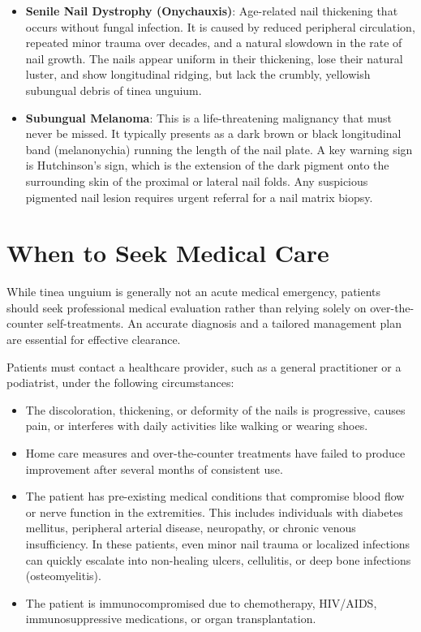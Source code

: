 \begin{itemize}
    \item \textbf{Senile Nail Dystrophy (Onychauxis)}: Age-related nail thickening that occurs without fungal infection. It is caused by reduced peripheral circulation, repeated minor trauma over decades, and a natural slowdown in the rate of nail growth. The nails appear uniform in their thickening, lose their natural luster, and show longitudinal ridging, but lack the crumbly, yellowish subungual debris of tinea unguium.
    \item \textbf{Subungual Melanoma}: This is a life-threatening malignancy that must never be missed. It typically presents as a dark brown or black longitudinal band (melanonychia) running the length of the nail plate. A key warning sign is Hutchinson's sign, which is the extension of the dark pigment onto the surrounding skin of the proximal or lateral nail folds. Any suspicious pigmented nail lesion requires urgent referral for a nail matrix biopsy.
\end{itemize}

\section*{When to Seek Medical Care}
While tinea unguium is generally not an acute medical emergency, patients should seek professional medical evaluation rather than relying solely on over-the-counter self-treatments. An accurate diagnosis and a tailored management plan are essential for effective clearance.

Patients must contact a healthcare provider, such as a general practitioner or a podiatrist, under the following circumstances:
\begin{itemize}
    \item The discoloration, thickening, or deformity of the nails is progressive, causes pain, or interferes with daily activities like walking or wearing shoes.
    \item Home care measures and over-the-counter treatments have failed to produce improvement after several months of consistent use.
    \item The patient has pre-existing medical conditions that compromise blood flow or nerve function in the extremities. This includes individuals with diabetes mellitus, peripheral arterial disease, neuropathy, or chronic venous insufficiency. In these patients, even minor nail trauma or localized infections can quickly escalate into non-healing ulcers, cellulitis, or deep bone infections (osteomyelitis).
    \item The patient is immunocompromised due to chemotherapy, HIV/AIDS, immunosuppressive medications, or organ transplantation.
\end{itemize}

